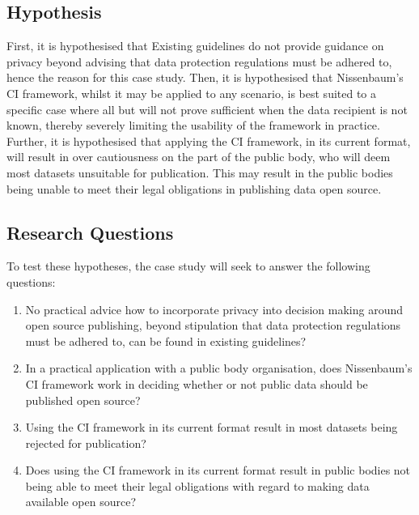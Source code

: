 \subsection {Hypothesis}
First, it is hypothesised that Existing guidelines do not provide guidance on privacy beyond advising that data protection regulations must be adhered to, hence the reason for this case study. %
Then, it is hypothesised that Nissenbaum's CI framework, whilst it may be applied to any scenario, is best suited to a specific case where all but will not prove sufficient when the data recipient is not known, thereby severely limiting the usability of the framework in practice.  %
Further, it is hypothesised that applying the CI framework, in its current format, will result in over cautiousness on the part of the public body, who will deem most datasets unsuitable for publication. This may result in the public bodies being unable to meet their legal obligations in publishing data open source. 

\subsection {Research Questions}
To test these hypotheses, the case study will seek to answer the following questions:

\begin{enumerate}
\item No practical advice how to incorporate privacy into decision making around open source publishing, beyond stipulation that data protection regulations must be adhered to, can be found in existing guidelines? %
\item In a practical application with a public body organisation, does Nissenbaum's CI framework work in deciding whether or not public data should be published open source?
\item Using the CI framework in its current format result in most datasets being rejected for publication? %
\item Does using the CI framework in its current format result in public bodies not being able to meet their legal obligations with regard to making data available open source? %
\end{enumerate}


